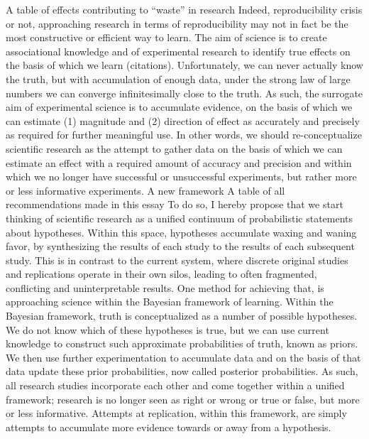 \documentclass[12pt]{article}
\begin{document}
A table of effects contributing to “waste” in research
Indeed, reproducibility crisis or not, approaching research in terms of reproducibility may not in fact be the most constructive or efficient way to learn. The aim of science is to create associational knowledge and of experimental research to identify true effects on the basis of which we learn (citations). Unfortunately, we can never actually know the truth, but with accumulation of enough data, under the strong law of large numbers we can converge infinitesimally close to the truth. As such, the surrogate aim of experimental science is to accumulate evidence, on the basis of which we can estimate (1) magnitude and (2) direction of effect as accurately and precisely as required for further meaningful use. In other words, we should re-conceptualize scientific research as the attempt to gather data on the basis of which we can estimate an effect with a required amount of accuracy and precision and within which we no longer have successful or unsuccessful experiments, but rather more or less informative experiments.
A new framework
A table of all recommendations made in this essay
To do so, I hereby propose that we start thinking of scientific research as a unified continuum of probabilistic statements about hypotheses. Within this space, hypotheses accumulate waxing and waning favor, by synthesizing the results of each study to the results of each subsequent study. This is in contrast to the current system, where discrete original studies and replications operate in their own silos, leading to often fragmented, conflicting and uninterpretable results. One method for achieving that, is approaching science within the Bayesian framework of learning. 
Within the Bayesian framework, truth is conceptualized as a number of possible hypotheses. We do not know which of these hypotheses is true, but we can use current knowledge to construct such approximate probabilities of truth, known as priors. We then use further experimentation to accumulate data and on the basis of that data update these prior probabilities, now called posterior probabilities. As such, all research studies incorporate each other and come together within a unified framework; research is no longer seen as  right or wrong or true or false, but more or less informative. Attempts at replication, within this framework, are simply attempts to accumulate more evidence towards or away from a hypothesis.
\end{document}
